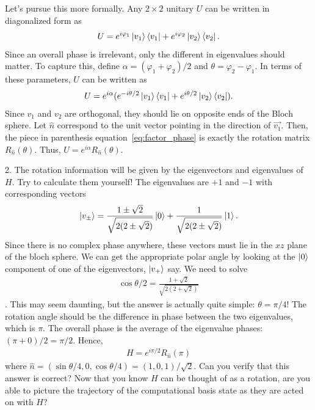 \documentclass{book}
\begin{document}
    Let's pursue this more formally. Any $2\times2$ unitary $U$ can be written in diagonalized form as 
    \begin{align}
        U = e^{i\varphi_1} \ket{v_1}\bra{v_1} + e^{i\varphi_2} \ket{v_2}\bra{v_2}.
    \end{align}
    Since an overall phase is irrelevant, only the different in eigenvalues should matter. To capture this, define $\alpha = (\varphi_1 + \varphi_2)/2$ and $\theta = \varphi_2 - \varphi_1$. In terms of these parameters, $U$ can be written as 
    \begin{align} \label{eq:factor_phase}
        U = e^{i\alpha}(e^{-i\theta/2} \ket{v_1}\bra{v_1} + e^{i\theta/2} \ket{v_2}\bra{v_2}).
    \end{align}
    Since $v_1$ and $v_2$ are orthogonal, they should lie on opposite ends of the Bloch sphere. Let $\hat{n}$ correspond to the unit vector pointing in the direction of $\vec{v_1}$. Then, the piece in parenthesis equation~\eqref{eq:factor_phase} is exactly the rotation matrix $R_{\hat{n}}(\theta)$. Thus, $U = e^{i\alpha} R_{\hat{n}}(\theta)$. 
    
    2. The rotation information will be given by the eigenvectors and eigenvalues of $H$. Try to calculate them yourself! The eigenvalues are $+1$ and $-1$ with corresponding vectors 
    \begin{align}
        \ket{v_\pm} = \frac{1\pm\sqrt{2}}{\sqrt{2(2\pm\sqrt{2})}}\ket{0} + \frac{1}{\sqrt{2(2\pm\sqrt{2})}}\ket{1}.
    \end{align}
    Since there is no complex phase anywhere, these vectors must lie in the $xz$ plane of the bloch sphere. We can get the appropriate polar angle by looking at the $\ket{0}$ component of one of the eigenvectors, $\ket{v_+}$ say. We need to solve
    \begin{align}
        \cos\theta/2 = \frac{1 + \sqrt{2}}{\sqrt{2(2+\sqrt{2})}}
    \end{align}.
    This may seem daunting, but the answer is actually quite simple: $\theta = \pi/4$! The rotation angle should be the difference in phase between the two eigenvalues, which is $\pi$. The overall phase is the average of the eigenvalue phases: $(\pi + 0)/2 = \pi/2$. Hence,
    \begin{align}
        H = e^{i\pi/2} R_{\hat{n}}(\pi)
    \end{align}
    where $\hat{n} = (\sin\theta/4, 0, \cos\theta/4) = (1,0,1)/\sqrt{2}$. Can you verify that this answer is correct? Now that you know $H$ can be thought of as a rotation, are you able to picture the trajectory of the computational basis state as they are acted on with $H$?
    
\end{document}
